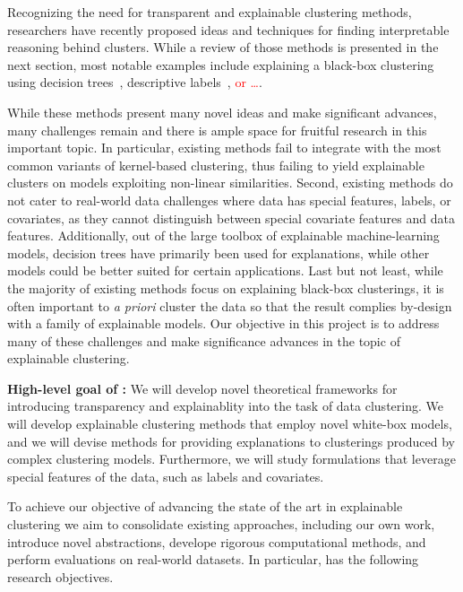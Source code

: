 \documentclass[a4paper,11pt]{article}
\begin{document}
Recognizing the need for transparent and explainable clustering methods, 
researchers have recently proposed ideas and techniques for finding 
interpretable reasoning behind clusters.
While a review of those methods is presented in the next section, 
most notable examples include 
explaining a black-box clustering using decision trees~\cite{gupta2023price,moshkovitz2020explainable},
descriptive labels~\cite{davidson2018cluster,sambaturu2020efficient}, 
\textcolor{red}{or \ldots}.

While these methods present many novel ideas and make significant advances, 
many challenges remain and there is ample space for fruitful research in this important topic. 
In particular, existing methods fail to integrate with the most common variants of kernel-based clustering, 
thus failing to yield explainable clusters on models exploiting non-linear similarities.
Second, existing methods do not cater to real-world data challenges where data has special features, 
labels, or covariates, as they cannot distinguish between special covariate features and data features.
Additionally, out of the large toolbox of explainable machine-learning models,
decision trees have primarily been used for explanations, 
while other models could be better suited for certain applications. 
Last but not least, while the majority of existing methods focus on explaining black-box clusterings, 
it is often important to \emph{a priori} cluster the data so that the result complies 
by-design with a family of explainable models.
Our objective in this project is to address many of these challenges
and make significance advances in the topic of explainable clustering.

\medskip
\noindent
\hspace{-3mm}\colorbox{verylightmagenta}{
\begin{minipage}{\textwidth}
{\bf High-level goal of \acronym:} 
We will develop novel theoretical frameworks for 
introducing transparency and explainablity into the task of data clustering. 
We will develop explainable clustering methods that employ novel white-box models, 
and we will devise methods for providing explanations to clusterings produced by complex clustering models.
Furthermore, we will study formulations that leverage special features of the data,
such as labels and covariates.
\end{minipage}}

To achieve our objective of advancing the state of the art in explainable clustering
we aim to consolidate existing approaches,  including our own work,  
introduce novel abstractions, 
develope rigorous computational methods, and 
perform evaluations on real-world datasets.
In particular, {\acronym} has the following research objectives. 
\end{document}
